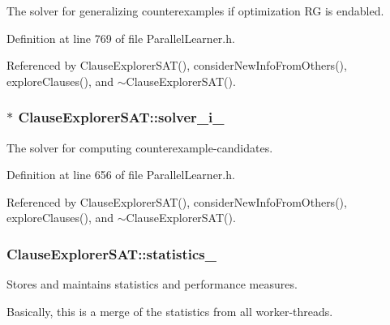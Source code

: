 The solver for generalizing counterexamples if optimization R\-G is endabled. 



Definition at line 769 of file Parallel\-Learner.\-h.



Referenced by Clause\-Explorer\-S\-A\-T(), consider\-New\-Info\-From\-Others(), explore\-Clauses(), and $\sim$\-Clause\-Explorer\-S\-A\-T().

\hypertarget{classClauseExplorerSAT_a65b5b3d04ff5be8bfec60d3dcf86e4d0}{
\subsubsection[{solver\-\_\-i\-\_\-}]{$\ast$ Clause\-Explorer\-S\-A\-T\-::solver\-\_\-i\-\_\-\hspace{0.3cm}{\ttfamily [protected]}}}\label{classClauseExplorerSAT_a65b5b3d04ff5be8bfec60d3dcf86e4d0}


The solver for computing counterexample-\/candidates. 



Definition at line 656 of file Parallel\-Learner.\-h.



Referenced by Clause\-Explorer\-S\-A\-T(), consider\-New\-Info\-From\-Others(), explore\-Clauses(), and $\sim$\-Clause\-Explorer\-S\-A\-T().

\hypertarget{classClauseExplorerSAT_a1d37eb0233177911835bc073fbe1c224}{
\subsubsection[{statistics\-\_\-}]{ Clause\-Explorer\-S\-A\-T\-::statistics\-\_\-\hspace{0.3cm}{\ttfamily [protected]}}}\label{classClauseExplorerSAT_a1d37eb0233177911835bc073fbe1c224}


Stores and maintains statistics and performance measures. 

Basically, this is a merge of the statistics from all worker-\/threads. 


